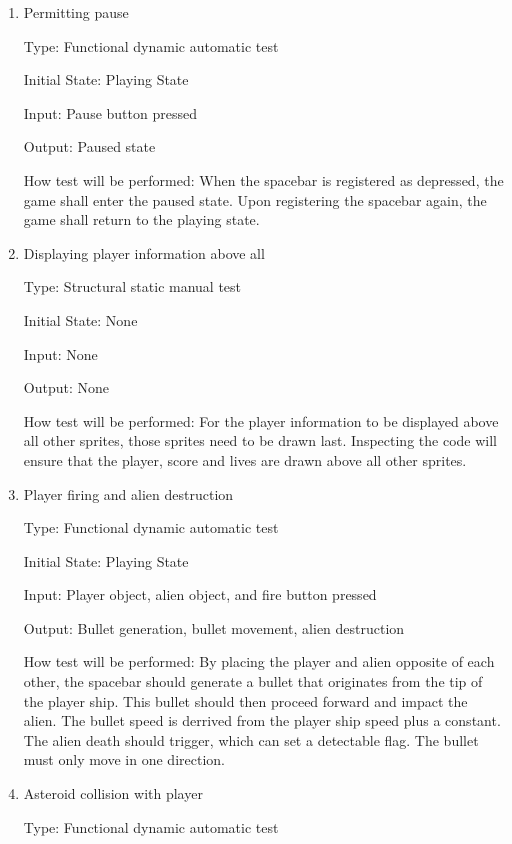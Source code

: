 \documentclass[12pt, titlepage]{article}
\begin{document}
\begin{enumerate}

\item{Permitting pause\\}

Type: Functional dynamic automatic test

Initial State: Playing State

Input: Pause button pressed

Output: Paused state

How test will be performed: When the spacebar is registered as depressed, the game shall enter the paused state. Upon registering the spacebar again, the game shall return to the playing state.

\item{Displaying player information above all\\}

Type: Structural static manual test

Initial State: None

Input: None

Output: None

How test will be performed: For the player information to be displayed above all other sprites, those sprites need to be drawn last. Inspecting the code will ensure that the player, score and lives are drawn above all other sprites.

\item{Player firing and alien destruction\\}

Type: Functional dynamic automatic test

Initial State: Playing State

Input: Player object, alien object, and fire button pressed

Output: Bullet generation, bullet movement, alien destruction

How test will be performed: By placing the player and alien opposite of each other, the spacebar should generate a bullet that originates from the tip of the player ship. This bullet should then proceed forward and impact the alien. The bullet speed is derrived from the player ship speed plus a constant. The alien death should trigger, which can set a detectable flag. The bullet must only move in one direction.

\item{Asteroid collision with player\\}

Type: Functional dynamic automatic test


\end{enumerate}
\end{document}
